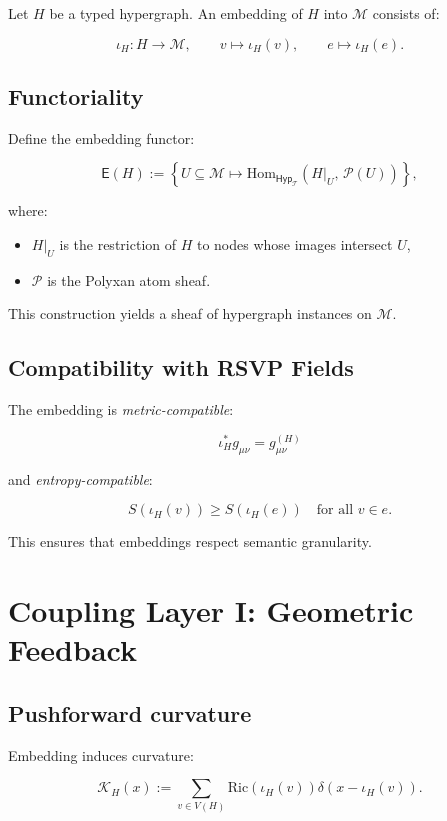 Let $H$ be a typed hypergraph.  
An embedding of $H$ into $\mathcal{M}$ consists of:

\[
\iota_H : H \longrightarrow \mathcal{M},
\qquad 
v \mapsto \iota_H(v),
\qquad
e \mapsto \iota_H(e).
\]

\subsection{Functoriality}

Define the embedding functor:

\[
\mathsf{E}(H)
:=
\left\{
  U \subseteq \mathcal{M}
  \mapsto
  \mathrm{Hom}_{\mathsf{Hyp}_{\mathcal{T}}}
    (H|_U,\, 
     \mathscr{P}(U))
\right\},
\]

where:

\begin{itemize}
  \item $H|_U$ is the restriction of $H$ to nodes whose images intersect $U$,
  \item $\mathscr{P}$ is the Polyxan atom sheaf.
\end{itemize}

This construction yields a sheaf of hypergraph instances on $\mathcal{M}$.


\subsection{Compatibility with RSVP Fields}

The embedding is \emph{metric-compatible}:

\[
\iota_H^\ast g_{\mu\nu}
=
g^{(H)}_{\mu\nu}
\]

and \emph{entropy-compatible}:

\[
S(\iota_H(v)) \ge S(\iota_H(e)) \quad\text{for all } v\in e.
\]

This ensures that embeddings respect semantic granularity.


\section{Coupling Layer I: Geometric Feedback}

\subsection{Pushforward curvature}

Embedding induces curvature:

\[
\mathcal{K}_H(x)
:=
\sum_{v\in V(H)} 
\mathrm{Ric}\!\left(\iota_H(v)\right)
\delta(x-\iota_H(v)).
\]

